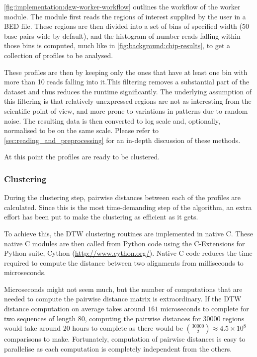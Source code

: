 \documentclass[parskip]{cs4rep}
\begin{document}
\autoref{fig:implementation:dgw-worker-workflow} outlines the workflow of the worker module.
The module first reads the regions of interest supplied by the user in a BED file. These regions are then divided into a set of bins of specified width (50 base pairs wide by default), and the histogram of number reads falling within those bins is computed, much like in \autoref{fig:background:chip-results}, to get a collection of profiles to be analysed. 

These profiles are then by keeping only the ones that have at least one bin with more than 10 reads falling into it.This filtering removes a substantial part of the dataset and thus reduces the runtime significantly. The underlying assumption of this filtering is that relatively unexpressed regions are not as interesting from the scientific point of view, and more prone to variations in patterns due to random noise. The resulting data is then converted to log scale and, optionally, normalised to be on the same scale. Please refer to \autoref{sec:reading_and_preprocessing} for an in-depth discussion of these methods.

At this point the profiles are ready to be clustered.

\subsubsection{Clustering}
During the clustering step, pairwise distances between each of the profiles are calculated.
Since this is the most time-demanding step of the algorithm, an extra effort has been put to make the clustering as efficient as it gets. 

To achieve this, the DTW clustering routines are implemented in native C. These native C modules are then called from Python code using the C-Extensions for Python suite, Cython (\url{http://www.cython.org/}). Native C code reduces the time required to compute the distance between two alignments from milliseconds to microseconds.

Microseconds might not seem much, but the number of computations that are needed to compute the pairwise distance matrix is extraordinary. If the DTW distance computation on average takes around $161$ microseconds to complete for two sequences of length 80, computing the pairwise distances for $30000$ regions would take around $20$ hours to complete as there would be ${30000 \choose 2} \approx 4.5 \times 10^8$ comparisons to make. Fortunately, computation of pairwise distances is easy to parallelise as each computation is completely independent from the others.
\end{document}
